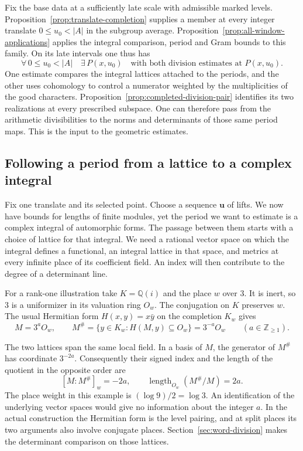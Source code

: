 Fix the base data at a sufficiently late scale with admissible
marked levels. Proposition~\ref{prop:translate-completion} supplies
a member at every integer translate \(0\le u_0<|A|\) in the
subgroup average. Proposition~\ref{prop:all-window-applications} applies the integral comparison, period and Gram bounds to this family. On its late intervals one thus has
\[
 \forall\,0\le u_0<|A|\quad\exists\,P(x,u_0)\quad
 \text{with both division estimates at }P(x,u_0).
\]
One estimate compares the integral lattices attached to the periods,
and the other uses cohomology to control a numerator weighted by
the multiplicities of the good characters.
Proposition~\ref{prop:completed-division-pair} identifies its two
realizations at every prescribed subspace. One can therefore pass
from the arithmetic divisibilities to the norms and determinants of
those same period maps. This is the input to the geometric estimates.

\subsection{Following a period from a lattice to a complex integral}

Fix one translate and its selected point. Choose a sequence \(\mathbf u\) of lifts. We now have bounds for lengths of finite modules, yet the period we want to
estimate is a complex integral of automorphic forms. The passage between them starts
with a choice of lattice for that integral. We need a rational vector space on which the integral defines a functional, an integral lattice in that space, and metrics at every infinite place of its coefficient field. An index will then contribute to the degree of a determinant line.

For a rank-one illustration take \(K=\mathbb Q(i)\) and the place \(w\) over \(3\). It is inert, so \(3\) is a uniformizer in its valuation ring \(O_w\). The conjugation on \(K\) preserves \(w\). The usual Hermitian form \(H(x,y)=x\bar y\) on the completion \(K_w\) gives
\[
 M=3^aO_w,\qquad M^\#=\{y\in K_w:H(M,y)\subseteq O_w\}=3^{-a}O_w
                                  \qquad(a\in\mathbb Z_{\ge1}).
\]

The two lattices span the same local field. In a basis of \(M\), the generator of \(M^\#\) has coordinate \(3^{-2a}\). Consequently their signed index and the length of the quotient in the opposite order are
\[
                [M:M^\#]_w=-2a,\qquad
                \operatorname{length}_{O_w}(M^\#/M)=2a .
\]
The place weight in this example is \((\log 9)/2=\log 3\). An identification of the underlying vector spaces would give no information about the integer \(a\). In the actual construction the Hermitian form is the level pairing, and at split places its two arguments also involve conjugate places. Section~\ref{sec:word-division} makes the determinant comparison on those lattices.

